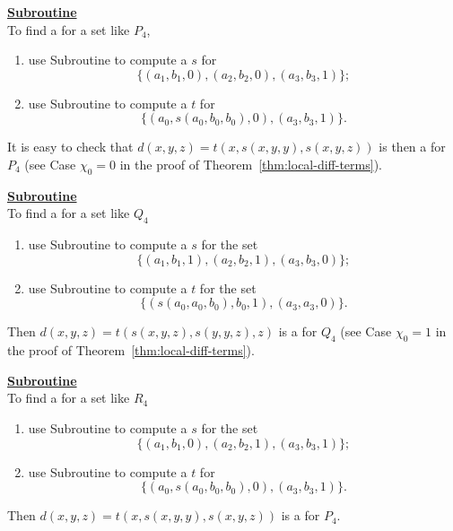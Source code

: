 \medskip

\noindent \underline{\textbf{Subroutine }}\\[4pt]
To find a \ldto for a set like $P_4$,
\begin{enumerate}
\item use Subroutine  to compute a \ldto $s$ for
\begin{equation*}
\{(a_1, b_1, 0),  (a_2, b_2, 0),  (a_3, b_3, 1)\};
\end{equation*}
\item use Subroutine  to compute a \ldto $t$ for
\begin{equation*}
\{(a_0, s(a_0, b_0, b_0), 0), (a_3, b_3, 1)\}.
\end{equation*}
\end{enumerate}
It is easy to check that
$d(x,y,z) = t(x, s(x,y,y), s(x,y,z))$
is then a \ldto for $P_4$
(see Case $\chi_0=0$ in the proof of Theorem~\ref{thm:local-diff-terms}).

\medskip

\noindent \underline{\textbf{Subroutine }}\\[4pt]
To find a \ldto for a set like $Q_4$
\begin{enumerate}
\item
use Subroutine  to compute a \ldto $s$ for the set
\begin{equation*}
\{(a_1, b_1, 1), (a_2, b_2, 1), (a_3, b_3, 0)\};
\end{equation*}
\item  use Subroutine  to compute a \ldto $t$
for the set
\begin{equation*}
\{(s(a_0, a_0, b_0), b_0, 1),  (a_3,a_3,0)\}.
\end{equation*}
\end{enumerate}
Then
$d(x,y,z) = t(s(x,y,z), s(y,y,z),z)$
is a \ldto  for $Q_4$ (see Case $\chi_0=1$ in the proof of Theorem~\ref{thm:local-diff-terms}).


\medskip

\noindent \underline{\textbf{Subroutine }}\\[4pt]
To find a \ldto for a set like $R_4$
\begin{enumerate}
\item
use Subroutine  to compute a \ldto $s$ for the set
\begin{equation*}
\{(a_1, b_1, 0), (a_2, b_2, 1), (a_3, b_3, 1)\};
\end{equation*}
\item use Subroutine  to compute a \ldto $t$ for
\begin{equation*}
\{(a_0, s(a_0, b_0, b_0), 0), (a_3, b_3, 1)\}.
\end{equation*}
\end{enumerate}
Then
$d(x,y,z) = t(x, s(x,y,y), s(x,y,z))$
is a \ldto for $P_4$.
